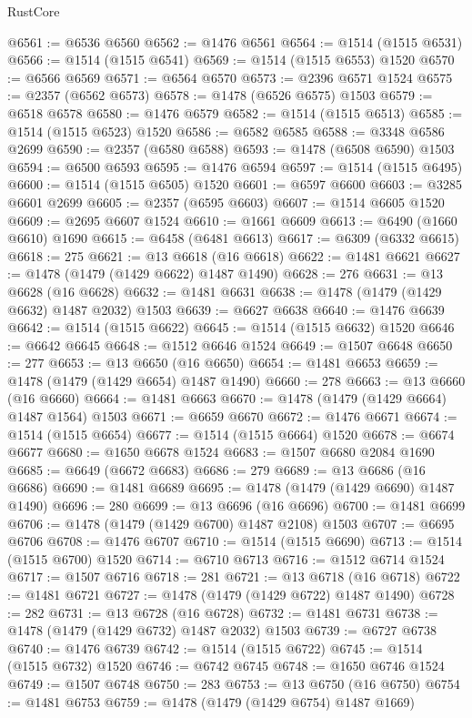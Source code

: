\begin{lexlean}{RustCore}
\begin{coremodule}
@6561 := @6536 @6560
@6562 := @1476 @6561
@6564 := @1514 (@1515 @6531)
@6566 := @1514 (@1515 @6541)
@6569 := @1514 (@1515 @6553) @1520
@6570 := @6566 @6569
@6571 := @6564 @6570
@6573 := @2396 @6571 @1524
@6575 := @2357 (@6562 @6573)
@6578 := @1478 (@6526 @6575) @1503
@6579 := @6518 @6578
@6580 := @1476 @6579
@6582 := @1514 (@1515 @6513)
@6585 := @1514 (@1515 @6523) @1520
@6586 := @6582 @6585
@6588 := @3348 @6586 @2699
@6590 := @2357 (@6580 @6588)
@6593 := @1478 (@6508 @6590) @1503
@6594 := @6500 @6593
@6595 := @1476 @6594
@6597 := @1514 (@1515 @6495)
@6600 := @1514 (@1515 @6505) @1520
@6601 := @6597 @6600
@6603 := @3285 @6601 @2699
@6605 := @2357 (@6595 @6603)
@6607 := @1514 @6605 @1520
@6609 := @2695 @6607 @1524
@6610 := @1661 @6609
@6613 := @6490 (@1660 @6610) @1690
@6615 := @6458 (@6481 @6613)
@6617 := @6309 (@6332 @6615)
@6618 := 275
@6621 := @13 @6618 (@16 @6618)
@6622 := @1481 @6621
@6627 := @1478 (@1479 (@1429 @6622) @1487 @1490)
@6628 := 276
@6631 := @13 @6628 (@16 @6628)
@6632 := @1481 @6631
@6638 := @1478 (@1479 (@1429 @6632) @1487 @2032) @1503
@6639 := @6627 @6638
@6640 := @1476 @6639
@6642 := @1514 (@1515 @6622)
@6645 := @1514 (@1515 @6632) @1520
@6646 := @6642 @6645
@6648 := @1512 @6646 @1524
@6649 := @1507 @6648
@6650 := 277
@6653 := @13 @6650 (@16 @6650)
@6654 := @1481 @6653
@6659 := @1478 (@1479 (@1429 @6654) @1487 @1490)
@6660 := 278
@6663 := @13 @6660 (@16 @6660)
@6664 := @1481 @6663
@6670 := @1478 (@1479 (@1429 @6664) @1487 @1564) @1503
@6671 := @6659 @6670
@6672 := @1476 @6671
@6674 := @1514 (@1515 @6654)
@6677 := @1514 (@1515 @6664) @1520
@6678 := @6674 @6677
@6680 := @1650 @6678 @1524
@6683 := @1507 @6680 @2084 @1690
@6685 := @6649 (@6672 @6683)
@6686 := 279
@6689 := @13 @6686 (@16 @6686)
@6690 := @1481 @6689
@6695 := @1478 (@1479 (@1429 @6690) @1487 @1490)
@6696 := 280
@6699 := @13 @6696 (@16 @6696)
@6700 := @1481 @6699
@6706 := @1478 (@1479 (@1429 @6700) @1487 @2108) @1503
@6707 := @6695 @6706
@6708 := @1476 @6707
@6710 := @1514 (@1515 @6690)
@6713 := @1514 (@1515 @6700) @1520
@6714 := @6710 @6713
@6716 := @1512 @6714 @1524
@6717 := @1507 @6716
@6718 := 281
@6721 := @13 @6718 (@16 @6718)
@6722 := @1481 @6721
@6727 := @1478 (@1479 (@1429 @6722) @1487 @1490)
@6728 := 282
@6731 := @13 @6728 (@16 @6728)
@6732 := @1481 @6731
@6738 := @1478 (@1479 (@1429 @6732) @1487 @2032) @1503
@6739 := @6727 @6738
@6740 := @1476 @6739
@6742 := @1514 (@1515 @6722)
@6745 := @1514 (@1515 @6732) @1520
@6746 := @6742 @6745
@6748 := @1650 @6746 @1524
@6749 := @1507 @6748
@6750 := 283
@6753 := @13 @6750 (@16 @6750)
@6754 := @1481 @6753
@6759 := @1478 (@1479 (@1429 @6754) @1487 @1669)

\end{coremodule}
\end{lexlean}
